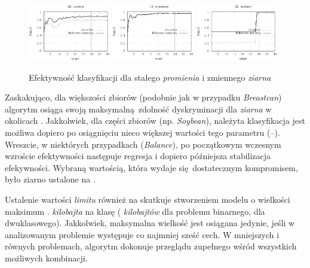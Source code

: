 \documentclass[]{article}
\begin{document}
\begin{figure}[!ht]
  \includegraphics[width=0.32\textwidth]{figures/grain_balance}
  \includegraphics[width=0.32\textwidth]{figures/grain_breastcan}
  \includegraphics[width=0.32\textwidth]{figures/grain_soybean}
  
  \caption{Efektywność klasyfikacji dla stałego \emph{promienia} i zmiennego \emph{ziarna}}
	\label{fig:grain}
\end{figure}

Zaskakująco, dla większości zbiorów (podobnie jak w przypadku \emph{Breastcan}) algorytm osiąga swoją maksymalną zdolność dyskryminacji dla \emph{ziarna} w okolicach . Jakkolwiek, dla części zbiorów (np. \emph{Soybean}), należyta klasyfikacja jest możliwa dopiero po osiągnięciu nieco większej wartości tego parametru (--). Wreszcie, w niektórych przypadkach (\emph{Balance}), po początkowym wczesnym wzroście efektywności następuje regresja i dopiero późniejsza stabilizacja efekywności. Wybraną wartością, która wydaje się dostatecznym kompromisem, było ziarno ustalone na . 

Ustalenie wartości \emph{limitu} również na  skutkuje stworzeniem modelu o wielkości maksimum . \emph{kilobajta} na klasę ( \emph{kilobajtów} dla problemu binarnego,  dla dwuklasowego). Jakkolwiek, maksymalna wielkość jest osiągana jedynie, jeśli w analizowanym problemie występuje co najmniej sześć cech. W mniejszych i równych problemach, algorytm dokonuje przeglądu zupełnego wśród wszystkich możliwych kombinacji.
\end{document}
